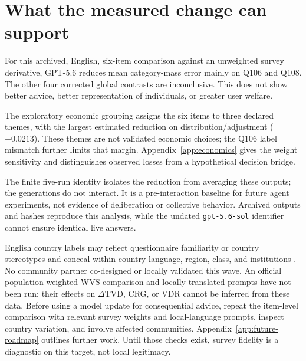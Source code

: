 \section{What the measured change can support}

For this archived, English, six-item comparison against an unweighted survey
derivative, GPT-5.6 reduces mean category-mass error mainly on Q106 and Q108.
The other four corrected global contrasts are inconclusive. This does not show
better advice, better representation of individuals, or greater user welfare.

The exploratory economic grouping assigns the six items to three declared
themes, with the largest estimated reduction on distribution/adjustment
($-0.0213$). These themes are not validated economic choices; the Q106 label
mismatch further limits that margin. Appendix~\ref{app:economics} gives the
weight sensitivity and distinguishes observed losses from a hypothetical
decision bridge.

The finite five-run identity isolates the reduction from averaging these
outputs; the generations do not interact. It is a pre-interaction baseline
for future agent experiments, not evidence of deliberation or collective
behavior. Archived outputs and hashes reproduce this analysis, while the
undated \texttt{gpt-5.6-sol} identifier cannot ensure identical live answers.

English country labels may reflect questionnaire familiarity or country
stereotypes and conceal within-country language, region, class, and
institutions \citep{nekoto2020participatory,mohamed2020decolonial,sen1999development}.
No community partner co-designed or locally validated this wave. An official
population-weighted WVS comparison and locally translated prompts have not
been run; their effects on $\Delta\mathrm{TVD}$, CRG, or VDR cannot be inferred
from these data. Before using a model update for consequential advice, repeat
the item-level comparison with relevant survey weights and local-language
prompts, inspect country variation, and involve affected communities.
Appendix~\ref{app:future-roadmap} outlines further work. Until those checks
exist, survey fidelity is a diagnostic on this target, not local legitimacy.
